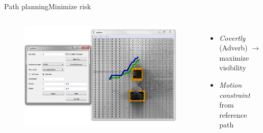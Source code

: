 \begin{frame}{Path planning}{Minimize risk}

\begin{columns}
\begin{figure}
\centering
\includegraphics[width = \textwidth]{./screenshot/risk_min_path.png}
\end{figure}

\begin{minipage}{\textwidth}
\begin{itemize}
\item \emph{Covertly} (Adverb) $ \rightarrow $ maximize visibility
\item \emph{Motion constraint} from reference path
\end{itemize}
\end{minipage}
\end{columns}

\end{frame}
